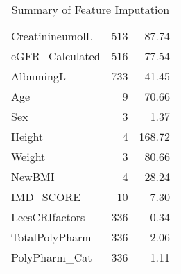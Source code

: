 \documentclass{article}
\begin{document}
\begin{table}[H]
\begin{tabular}{lrr}
    CreatinineumolL & 513 & 87.74 \\
    eGFR\_Calculated & 516 & 77.54 \\
    AlbumingL & 733 & 41.45 \\
    Age & 9 & 70.66 \\
    Sex & 3 & 1.37 \\
    Height & 4 & 168.72 \\
    Weight & 3 & 80.66 \\
    NewBMI & 4 & 28.24 \\
    IMD\_SCORE & 10 & 7.30 \\
    LeesCRIfactors & 336 & 0.34 \\
    TotalPolyPharm & 336 & 2.06 \\
    PolyPharm\_Cat & 336 & 1.11 \\
    \bottomrule
    \end{tabular}
    \caption{Summary of Feature Imputation}
    \label{tab:imputation-summary}
\end{table}
\end{document}
